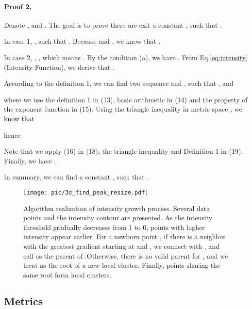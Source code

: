 \documentclass[letterpaper]{article} \usepackage{aaai22}  \usepackage{times}  \usepackage{helvet}  \usepackage{courier}  \usepackage[hyphens]{url}  \usepackage{graphicx} \urlstyle{rm} \def\UrlFont{\rm}  \usepackage{natbib}  \usepackage{caption} \DeclareCaptionStyle{ruled}{labelfont=normalfont,labelsep=colon,strut=off} \frenchspacing  \setlength{\pdfpagewidth}{8.5in}  \setlength{\pdfpageheight}{11in}  \usepackage{subfigure}
\begin{document}
\paragraph{Proof 2.} 
Denote ,  and . The goal is to prove there are exit a constant , such that . 

\quad

In case 1, , such that . Because  and , we know that . 

\quad

In case 2, , , which means . By the condition (a), we have . From Eq.\ref{eq:intensity} (Intensity Function), we derive that . 

\quad

According to the definition 1, we can find two sequence  and , such that , and
{\small

}where we use the definition 1 in (13), basic arithmetic in (14) and the property of the exponent function in (15). Using the triangle inequality in metric space  , we know that

{\small

}

hence 

{\small

}

Note that we apply (16) in (18), the triangle inequality and Definition 1 in (19). Finally, we have .




\quad

In summary, we can find a constant , such that .


\begin{figure}[h]
    \centering
    \texttt{[image: pic/3d\_find\_peak\_resize.pdf]}
    \caption{ Algorithm realization of intensity growth process. Several data points and the intensity contour are presented. As the intensity threshold gradually decreases from 1 to 0, points with higher intensity appear earlier. For a newborn point , if there is a neighbor  with the greatest gradient starting at  and , we connect  with , and call  as the parent of .Otherwise, there is no valid parent for , and we treat  as the root of a new local cluster. Finally, points sharing the same root form local clusters.}
    \label{fig:3d_find_peak}
\end{figure}

\clearpage
\subsection{Metrics}
\label{sup:metrics}
\end{document}
